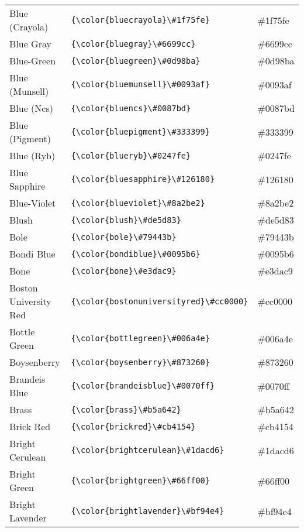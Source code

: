 \documentclass[9.5pt]{article}
\begin{document}
\begin{longtable}{l | l | l}
	Blue (Crayola) & \verb!{\color{bluecrayola}\#1f75fe}! & {\color{bluecrayola}\#1f75fe}\\
	Blue Gray & \verb!{\color{bluegray}\#6699cc}! & {\color{bluegray}\#6699cc}\\
	Blue-Green & \verb!{\color{bluegreen}\#0d98ba}! & {\color{bluegreen}\#0d98ba}\\
	Blue (Munsell) & \verb!{\color{bluemunsell}\#0093af}! & {\color{bluemunsell}\#0093af}\\
	Blue (Ncs) & \verb!{\color{bluencs}\#0087bd}! & {\color{bluencs}\#0087bd}\\
	Blue (Pigment) & \verb!{\color{bluepigment}\#333399}! & {\color{bluepigment}\#333399}\\
	Blue (Ryb) & \verb!{\color{blueryb}\#0247fe}! & {\color{blueryb}\#0247fe}\\
	Blue Sapphire & \verb!{\color{bluesapphire}\#126180}! & {\color{bluesapphire}\#126180}\\
	Blue-Violet & \verb!{\color{blueviolet}\#8a2be2}! & {\color{blueviolet}\#8a2be2}\\
	Blush & \verb!{\color{blush}\#de5d83}! & {\color{blush}\#de5d83}\\
	Bole & \verb!{\color{bole}\#79443b}! & {\color{bole}\#79443b}\\
	Bondi Blue & \verb!{\color{bondiblue}\#0095b6}! & {\color{bondiblue}\#0095b6}\\
	Bone & \verb!{\color{bone}\#e3dac9}! & {\color{bone}\#e3dac9}\\
	Boston University Red & \verb!{\color{bostonuniversityred}\#cc0000}! & {\color{bostonuniversityred}\#cc0000}\\
	Bottle Green & \verb!{\color{bottlegreen}\#006a4e}! & {\color{bottlegreen}\#006a4e}\\
	Boysenberry & \verb!{\color{boysenberry}\#873260}! & {\color{boysenberry}\#873260}\\
	Brandeis Blue & \verb!{\color{brandeisblue}\#0070ff}! & {\color{brandeisblue}\#0070ff}\\
	Brass & \verb!{\color{brass}\#b5a642}! & {\color{brass}\#b5a642}\\
	Brick Red & \verb!{\color{brickred}\#cb4154}! & {\color{brickred}\#cb4154}\\
	Bright Cerulean & \verb!{\color{brightcerulean}\#1dacd6}! & {\color{brightcerulean}\#1dacd6}\\
	Bright Green & \verb!{\color{brightgreen}\#66ff00}! & {\color{brightgreen}\#66ff00}\\
	Bright Lavender & \verb!{\color{brightlavender}\#bf94e4}! & {\color{brightlavender}\#bf94e4}\\

\end{longtable}
\end{document}
